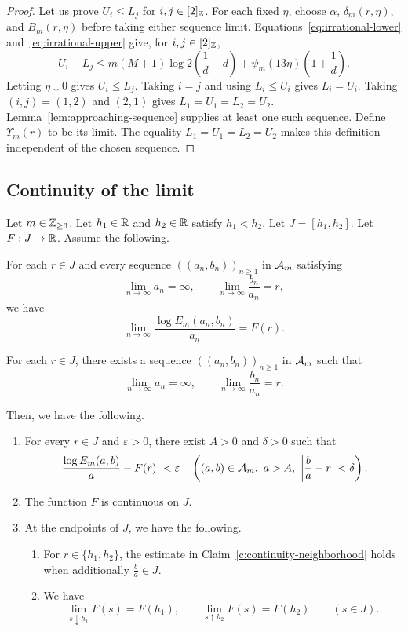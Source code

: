 \begin{proof}
Let us prove $U_i\le L_j$ for $i,j\in[2]_{\mathbb Z}$.
For each fixed $\eta$, choose $\alpha$, $\delta_m(r,\eta)$, and $B_m(r,\eta)$ before taking either sequence limit.
Equations~\eqref{eq:irrational-lower} and~\eqref{eq:irrational-upper} give, for $i,j\in[2]_{\mathbb Z}$,
\[
 U_i-L_j\le m(M+1)\log2\left(\frac1d-d\right)
      +\psi_m(13\eta)\left(1+\frac1d\right).
\]
Letting $\eta\downarrow0$ gives $U_i\le L_j$.
Taking $i=j$ and using $L_i\le U_i$ gives $L_i=U_i$.
Taking $(i,j)=(1,2)$ and $(2,1)$ gives $L_1=U_1=L_2=U_2$.
Lemma~\ref{lem:approaching-sequence} supplies at least one such sequence.
Define $\Upsilon_m(r)$ to be its limit. The equality $L_1=U_1=L_2=U_2$ makes this definition independent of the chosen sequence.
\end{proof}

\subsection{Continuity of the limit}
\begin{lemma}\label{lem:continuity}
Let $m\in\mathbb Z_{\ge3}$.
Let $h_1\in\mathbb R$ and $h_2\in\mathbb R$ satisfy $h_1<h_2$. Let $J=[h_1,h_2]$.
Let $F:J\to\mathbb R$. Assume the following.
\begin{hypotheses}
\item\label{hyp:all-sequence-limit} For each $r\in J$ and every sequence $((a_n,b_n))_{n\ge1}$ in $\mathcal A_m$ satisfying
\[
 \lim_{n\to\infty}a_n=\infty,\qquad
 \lim_{n\to\infty}\frac{b_n}{a_n}=r,
\]
we have
\[
 \lim_{n\to\infty}\frac{\log E_m(a_n,b_n)}{a_n}=F(r).
\]
\item\label{hyp:approaching-sequences} For each $r\in J$, there exists a sequence $((a_n,b_n))_{n\ge1}$ in $\mathcal A_m$ such that
\[
 \lim_{n\to\infty}a_n=\infty,\qquad
 \lim_{n\to\infty}\frac{b_n}{a_n}=r.
\]
\end{hypotheses}
Then, we have the following.

\begin{enumerate}
\item\label{c:continuity-neighborhood} For every $r\in J$ and $\varepsilon>0$, there exist $A>0$ and $\delta>0$ such that
\begin{equation}\label{eq:continuity-neighborhood}
 \left|\frac{\log E_m(a,b)}a-F(r)\right|<\varepsilon
 \quad\left((a,b)\in\mathcal A_m,\ a>A,\ \left|\frac ba-r\right|<\delta\right).
\end{equation}
\item\label{c:continuity-function} The function $F$ is continuous on $J$.
\item\label{c:continuity-endpoint} At the endpoints of $J$, we have the following.
\begin{enumerate}[label=(\alph*),ref=\theenumi(\alph*)]
\item\label{c:continuity-endpoint-neighborhood} For $r\in\{h_1,h_2\}$, the estimate in Claim~\ref{c:continuity-neighborhood} holds when additionally $\frac ba\in J$.
\item\label{c:continuity-endpoint-function} We have
\[
 \lim_{s\downarrow h_1}F(s)=F(h_1),\qquad
 \lim_{s\uparrow h_2}F(s)=F(h_2)\qquad(s\in J).
\]
\end{enumerate}
\end{enumerate}
\end{lemma}
